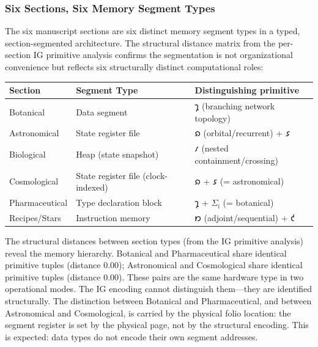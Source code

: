 \documentclass[12pt,a4paper]{article}
\begin{document}
\subsubsection{Six Sections, Six Memory Segment Types}

The six manuscript sections are six distinct memory segment types in a typed, section-segmented architecture. The structural distance matrix from the per-section IG primitive analysis confirms the segmentation is not organizational convenience but reflects six structurally distinct computational roles:

\begin{table}[htbp]
\centering
\small
{}
\begin{tabularx}{\textwidth}{>{\raggedright\arraybackslash}X >{\raggedright\arraybackslash}X >{\raggedright\arraybackslash}X}
\toprule
\rowcolor{gray!25}\textbf{Section} & \textbf{Segment Type} & \textbf{Distinguishing primitive} \\
\midrule
\rowcolors{1}{white}{gray!10}
Botanical     & Data segment          & $𐑡$ (branching network topology) \\
Astronomical  & State register file   & $𐑸$ (orbital/recurrent) + $𐑭$ \\
Biological    & Heap (state snapshot) & $𐑥$ (nested containment/crossing) \\
Cosmological  & State register file (clock-indexed) & $𐑸$ + $𐑭$ (= astronomical) \\
Pharmaceutical & Type declaration block & $𐑡$ + $\Sigma_\text{ï}$ (= botanical) \\
Recipes/Stars & Instruction memory    & $𐑽$ (adjoint/sequential) + $𐑒$ \\
\bottomrule
\end{tabularx}
\end{table}

The structural distances between section types (from the IG primitive analysis) reveal the memory hierarchy. Botanical and Pharmaceutical share identical primitive tuples (distance 0.00); Astronomical and Cosmological share identical primitive tuples (distance 0.00). These pairs are the same hardware type in two operational modes. The IG encoding cannot distinguish them---they are identified structurally. The distinction between Botanical and Pharmaceutical, and between Astronomical and Cosmological, is carried by the physical folio location: the segment register is set by the physical page, not by the structural encoding. This is expected: data types do not encode their own segment addresses.
\end{document}
